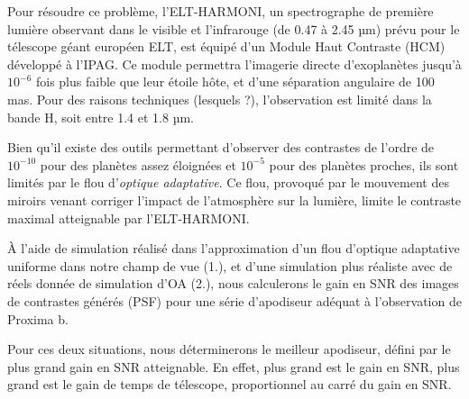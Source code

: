 Pour résoudre ce problème, l'ELT-HARMONI, un spectrographe de première lumière observant dans le visible et l'infrarouge (de 0.47 à 2.45 µm) prévu pour le télescope géant européen ELT, est équipé d'un Module Haut Contraste (HCM) développé à l'IPAG. Ce module permettra l'imagerie directe d'exoplanètes jusqu'à $10^{-6}$ fois plus faible que leur étoile hôte, et d'une séparation angulaire de 100 mas. Pour des raisons techniques (lesquels ?), l'observation est limité dans la bande H, soit entre 1.4 et 1.8 µm.

Bien qu'il existe des outils permettant d'observer des contrastes de l'ordre de $10^{-10}$ pour des planètes assez éloignées et $10^{-5}$ pour des planètes proches, ils sont limités par le flou d'\textsl{optique adaptative}. Ce flou, provoqué par le mouvement des miroirs venant corriger l'impact de l'atmosphère sur la lumière, limite le contraste maximal atteignable par l'ELT-HARMONI.

À l’aide de simulation réalisé dans l’approximation d’un flou d’optique adaptative uniforme dans notre champ de vue (1.), et d’une simulation plus réaliste avec de réels donnée de simulation d’OA (2.), nous calculerons le gain en SNR des images de contrastes générés (PSF) pour une série d’apodiseur adéquat à l’observation de Proxima b.

Pour ces deux situations, nous déterminerons le meilleur apodiseur, défini par le plus grand gain en SNR atteignable. En effet, plus grand est le gain en SNR, plus grand est le gain de temps de télescope, proportionnel au carré du gain en SNR.





